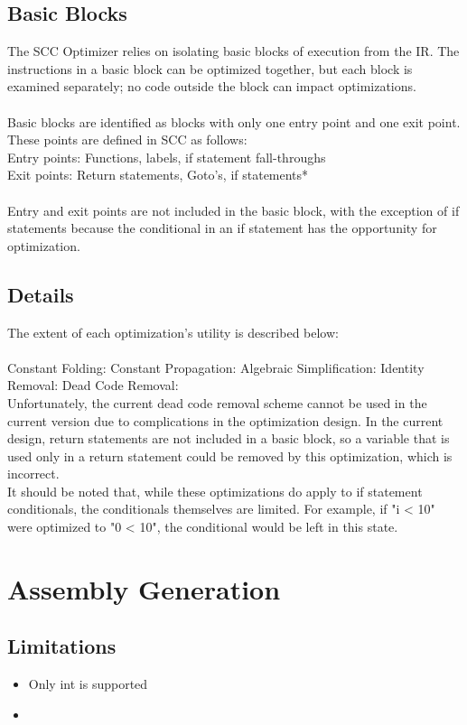 \documentclass{scrartcl}
\begin{document}
\subsection{Basic Blocks}
The SCC Optimizer relies on isolating basic blocks of execution from the IR. The instructions in a basic block can be optimized together, but each block is examined separately; no code outside the block can impact optimizations.\\
\\
Basic blocks are identified as blocks with only one entry point and one exit point. These points are defined in SCC as follows:\\
\indent\indent Entry points: Functions, labels, if statement fall-throughs\\
\indent\indent Exit points: Return statements, Goto's, if statements*\\
\\
Entry and exit points are not included in the basic block, with the exception of if statements because the conditional in an if statement has the opportunity for optimization.

\subsection{Details}
The extent of each optimization's utility is described below:\\
\\
Constant Folding: %
Constant Propagation: %
Algebraic Simplification: %
Identity Removal: %
Dead Code Removal: %
\\
Unfortunately, the current dead code removal scheme cannot be used in the current version due to complications in the optimization design. In the current design, return statements are not included in a basic block, so a variable that is used only in a return statement could be removed by this optimization, which is incorrect.\\

It should be noted that, while these optimizations do apply to if statement conditionals, the conditionals themselves are limited. For example, if "i < 10" were optimized to "0 < 10", the conditional would be left in this state.

\section{Assembly Generation}
\subsection{Limitations}
\begin{itemize}
    \item Only int is supported
    \item %
\end{itemize}
\end{document}
